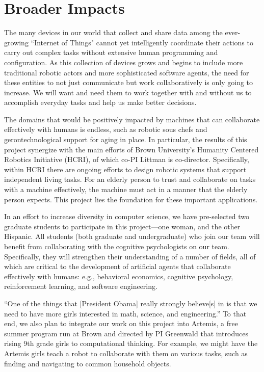 
\section{Broader Impacts}


The many devices in our world that collect and share data among the
ever-growing ``Internet of Things" cannot yet intelligently coordinate
their actions to carry out complex tasks without extensive human
programming and configuration.  As this collection of devices grows
and begins to include more traditional robotic actors and more
sophisticated software agents, the need for these entities to not just
communicate but work collaboratively is only going to increase.  We
will want and need them to work together with and without us to
accomplish everyday tasks and help us make better decisions.

The domains that would be positively impacted by machines
that can collaborate effectively with humans is endless, such as robotic sous chefs and
gerontechnological support for aging in place.
%
In particular, the results of this project synergize with the main efforts of 
Brown University's Humanity Centered Robotics Initiative (HCRI), of
which co-PI Littman is co-director. Specifically, within HCRI there
are ongoing efforts to design robotic systems that support independent
living tasks. For an elderly person to trust and collaborate on tasks with a machine effectively, the machine must act in a manner that the elderly person expects. This project lies the foundation for these important applications.

In an effort to increase diversity in computer science, we have
pre-selected two graduate students to participate in this
project---one woman, and the other Hispanic.  All students (both
graduate and undergraduate) who join our team will benefit from collaborating with the cognitive psychologists on our team.
Specifically, they will strengthen their understanding of a number of
fields, all of which are critical to the development of artificial
agents that collaborate effectively with humans: e.g., behavioral
economics, cognitive psychology, reinforcement learning, and software
engineering.

``One of the things that [President Obama] really strongly believe[s]
in is that we need to have more girls interested in math, science, and
engineering.''  To that end, we also plan to integrate our work on
this project into Artemis, a free summer program run at Brown and
directed by PI Greenwald that introduces rising 9th grade girls to
computational thinking.
For example, we might have the Artemis girls teach a robot to
collaborate with them on various tasks, such as finding and navigating
to common household objects.

